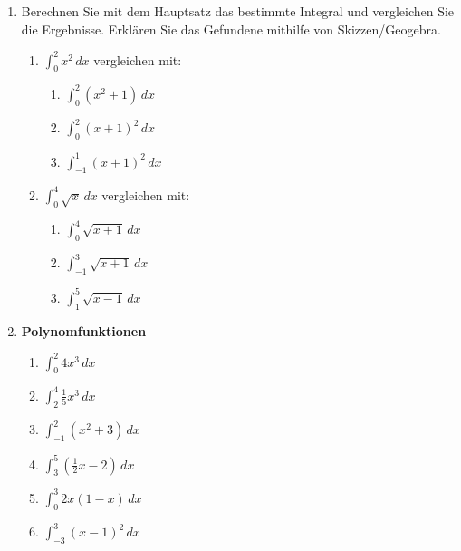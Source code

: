 \clearpage
\begin{ueb}
	{}{}
	\begin{enumerate}
		\item Berechnen Sie mit dem Hauptsatz das bestimmte Integral und vergleichen Sie die Ergebnisse. Erklären Sie das Gefundene mithilfe von Skizzen/Geogebra.
		      \begin{enumerate}
			      \item \(\displaystyle \int_0^2 x^2 \, dx \) vergleichen mit:
			            \begin{enumerate}
				            \item \(\displaystyle \int_0^2 (x^2 + 1) \, dx \)
				            \item \(\displaystyle \int_0^2 (x + 1)^2 \, dx \)
				            \item \(\displaystyle \int_{-1}^1 (x + 1)^2 \, dx \)
			            \end{enumerate}
			      \item \(\displaystyle \int_0^4 \sqrt{x} \, dx \) vergleichen mit:
			            \begin{enumerate}
				            \item \(\displaystyle \int_0^4 \sqrt{x + 1} \, dx \)
				            \item \(\displaystyle \int_{-1}^3 \sqrt{x + 1} \, dx \)
				            \item \(\displaystyle \int_1^5 \sqrt{x - 1} \, dx \)
			            \end{enumerate}
		      \end{enumerate}
		\item \textbf{Polynomfunktionen}
		      \begin{enumerate}
			      \item \(\displaystyle \int_0^2 4x^3 \, dx \)
			      \item \(\displaystyle \int_2^4 \frac{1}{5}x^3 \, dx \)
			      \item \(\displaystyle \int_{-1}^2 (x^2 + 3) \, dx \)
			      \item \(\displaystyle \int_3^5 \left( \frac{1}{2}x - 2 \right) \, dx \)
			      \item \(\displaystyle \int_0^3 2x(1 - x) \, dx \)
			      \item \(\displaystyle \int_{-3}^3 (x - 1)^2 \, dx \)
		      \end{enumerate}


\end{enumerate}
\end{ueb}
